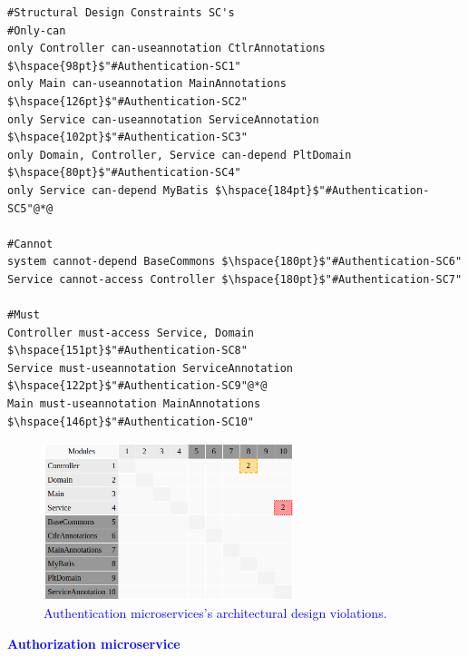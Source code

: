 \documentclass[12pt]{article}
\begin{document}
\begin{lstlisting}[style=colorido, caption={\textcolor{blue}{Authentication microservice's architectural design specification.}},label={list:especArquiteturalAuthentication}
]
#Structural Design Constraints SC's
#Only-can
only Controller can-useannotation CtlrAnnotations $\hspace{98pt}$"#Authentication-SC1"
only Main can-useannotation MainAnnotations	$\hspace{126pt}$"#Authentication-SC2"
only Service can-useannotation ServiceAnnotation $\hspace{102pt}$"#Authentication-SC3"
only Domain, Controller, Service can-depend PltDomain $\hspace{80pt}$"#Authentication-SC4"
only Service can-depend MyBatis	$\hspace{184pt}$"#Authentication-SC5"@*@

#Cannot
system cannot-depend BaseCommons $\hspace{180pt}$"#Authentication-SC6"
Service cannot-access Controller $\hspace{180pt}$"#Authentication-SC7"

#Must
Controller must-access Service, Domain	$\hspace{151pt}$"#Authentication-SC8"
Service must-useannotation ServiceAnnotation $\hspace{122pt}$"#Authentication-SC9"@*@
Main must-useannotation MainAnnotations	$\hspace{146pt}$"#Authentication-SC10"
\end{lstlisting}
\begin{figure}[ht]
\centering
\includegraphics[width=0.65\textwidth]{figuras/violacoesAuthentication.png}
\caption{\textcolor{blue}{Authentication microservices's architectural design violations.}}
\label{fig:microservices}
\end{figure}
\newpage
\noindent\textbf{\textcolor{blue}{Authorization microservice}}
\label{sec:ApendiceAuthorization}
\end{document}
